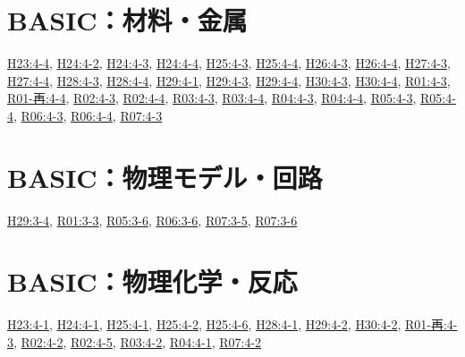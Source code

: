 \section{BASIC：材料・金属}
\hyperref[q:h23-reg-basic-4-4]{H23:4-4}, \hyperref[q:h24-reg-basic-4-2]{H24:4-2}, \hyperref[q:h24-reg-basic-4-3]{H24:4-3}, \hyperref[q:h24-reg-basic-4-4]{H24:4-4}, \hyperref[q:h25-reg-basic-4-3]{H25:4-3}, \hyperref[q:h25-reg-basic-4-4]{H25:4-4}, \hyperref[q:h26-reg-basic-4-3]{H26:4-3}, \hyperref[q:h26-reg-basic-4-4]{H26:4-4}, \hyperref[q:h27-reg-basic-4-3]{H27:4-3}, \hyperref[q:h27-reg-basic-4-4]{H27:4-4}, \hyperref[q:h28-reg-basic-4-3]{H28:4-3}, \hyperref[q:h28-reg-basic-4-4]{H28:4-4}, \hyperref[q:h29-reg-basic-4-1]{H29:4-1}, \hyperref[q:h29-reg-basic-4-3]{H29:4-3}, \hyperref[q:h29-reg-basic-4-4]{H29:4-4}, \hyperref[q:h30-reg-basic-4-3]{H30:4-3}, \hyperref[q:h30-reg-basic-4-4]{H30:4-4}, \hyperref[q:r01-reg-basic-4-3]{R01:4-3}, \hyperref[q:r01-ret-basic-4-4]{R01-再:4-4}, \hyperref[q:r02-reg-basic-4-3]{R02:4-3}, \hyperref[q:r02-reg-basic-4-4]{R02:4-4}, \hyperref[q:r03-reg-basic-4-3]{R03:4-3}, \hyperref[q:r03-reg-basic-4-4]{R03:4-4}, \hyperref[q:r04-reg-basic-4-3]{R04:4-3}, \hyperref[q:r04-reg-basic-4-4]{R04:4-4}, \hyperref[q:r05-reg-basic-4-3]{R05:4-3}, \hyperref[q:r05-reg-basic-4-4]{R05:4-4}, \hyperref[q:r06-reg-basic-4-3]{R06:4-3}, \hyperref[q:r06-reg-basic-4-4]{R06:4-4}, \hyperref[q:r07-reg-basic-4-3]{R07:4-3}
\section{BASIC：物理モデル・回路}
\hyperref[q:h29-reg-basic-3-4]{H29:3-4}, \hyperref[q:r01-reg-basic-3-3]{R01:3-3}, \hyperref[q:r05-reg-basic-3-6]{R05:3-6}, \hyperref[q:r06-reg-basic-3-6]{R06:3-6}, \hyperref[q:r07-reg-basic-3-5]{R07:3-5}, \hyperref[q:r07-reg-basic-3-6]{R07:3-6}
\section{BASIC：物理化学・反応}
\hyperref[q:h23-reg-basic-4-1]{H23:4-1}, \hyperref[q:h24-reg-basic-4-1]{H24:4-1}, \hyperref[q:h25-reg-basic-4-1]{H25:4-1}, \hyperref[q:h25-reg-basic-4-2]{H25:4-2}, \hyperref[q:h25-reg-basic-4-6]{H25:4-6}, \hyperref[q:h28-reg-basic-4-1]{H28:4-1}, \hyperref[q:h29-reg-basic-4-2]{H29:4-2}, \hyperref[q:h30-reg-basic-4-2]{H30:4-2}, \hyperref[q:r01-ret-basic-4-3]{R01-再:4-3}, \hyperref[q:r02-reg-basic-4-2]{R02:4-2}, \hyperref[q:r02-reg-basic-4-5]{R02:4-5}, \hyperref[q:r03-reg-basic-4-2]{R03:4-2}, \hyperref[q:r04-reg-basic-4-1]{R04:4-1}, \hyperref[q:r07-reg-basic-4-2]{R07:4-2}
